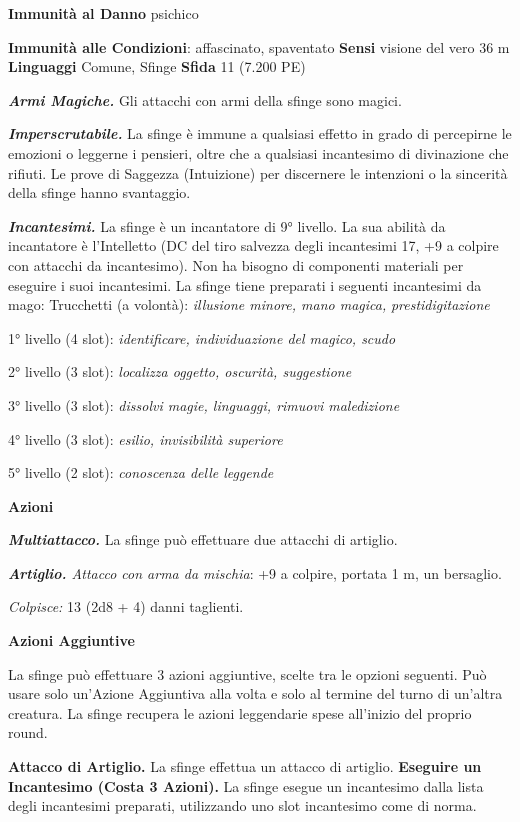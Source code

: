 \begin{multicols}{2}
\textbf{Immunità al Danno} psichico

\textbf{Immunità alle Condizioni}: affascinato, spaventato \textbf{Sensi}
visione del vero 36 m \textbf{Linguaggi} Comune,
Sfinge \textbf{Sfida} 11 (7.200 PE)\smallskip

\emph{\textbf{Armi Magiche.}} Gli attacchi con armi della sfinge sono
magici.

\emph{\textbf{Imperscrutabile.}} La sfinge è immune a qualsiasi effetto
in grado di percepirne le emozioni o leggerne i pensieri, oltre che a
qualsiasi incantesimo di divinazione che rifiuti. Le prove di Saggezza
(Intuizione) per discernere le intenzioni o la sincerità della sfinge
hanno svantaggio.

\emph{\textbf{Incantesimi.}} La sfinge è un incantatore di 9° livello.
La sua abilità da incantatore è l'Intelletto (DC del tiro salvezza
degli incantesimi 17, +9 a colpire con attacchi da incantesimo). Non ha
bisogno di componenti materiali per eseguire i suoi incantesimi. La
sfinge tiene preparati i seguenti incantesimi da mago: Trucchetti (a
volontà): \emph{illusione minore, mano magica,} \emph{prestidigitazione}

1° livello (4 slot): \emph{identificare, individuazione del magico,
scudo}

2° livello (3 slot): \emph{localizza oggetto, oscurità, suggestione}

3° livello (3 slot): \emph{dissolvi magie, linguaggi, rimuovi
maledizione}

4° livello (3 slot): \emph{esilio, invisibilità superiore}

5° livello (2 slot): \emph{conoscenza delle leggende}

\smallskip\textbf{Azioni}

\emph{\textbf{Multiattacco.}} La sfinge può effettuare due attacchi di
artiglio.

\emph{\textbf{Artiglio.} Attacco con arma da mischia}: +9 a colpire,
portata 1 m, un bersaglio.

\emph{Colpisce:} 13 (2d8 + 4) danni taglienti.

\textbf{Azioni Aggiuntive}

La sfinge può effettuare 3 azioni aggiuntive, scelte tra le opzioni
seguenti. Può usare solo un'Azione Aggiuntiva alla volta e solo al
termine del turno di un'altra creatura. La sfinge recupera le azioni
leggendarie spese all'inizio del proprio round.

\textbf{Attacco di Artiglio.} La sfinge effettua un attacco di artiglio.
\textbf{Eseguire un Incantesimo (Costa 3 Azioni).} La sfinge esegue un
incantesimo dalla lista degli incantesimi preparati, utilizzando uno
slot incantesimo come di norma.


\end{multicols}

